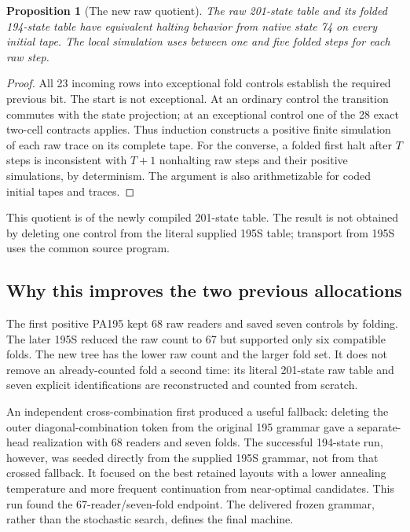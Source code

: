 \documentclass[11pt,letterpaper]{article}
\newtheorem{proposition}[theorem]{Proposition}
\begin{document}
\begin{proposition}[The new raw quotient]
The raw 201-state table and its folded 194-state table have equivalent
halting behavior from native state 74 on every initial tape. The local
simulation uses between one and five folded steps for each raw step.
\end{proposition}
\begin{proof}
All 23 incoming rows into exceptional fold controls establish the required
previous bit. The start is not exceptional. At an ordinary control the
transition commutes with the state projection; at an exceptional control
one of the 28 exact two-cell contracts applies. Thus induction constructs
a positive finite simulation of each raw trace on its complete tape.
For the converse, a folded first halt after $T$ steps is inconsistent with
$T+1$ nonhalting raw steps and their positive simulations, by determinism.
The argument is also arithmetizable for coded initial tapes and traces.
\end{proof}

This quotient is of the newly compiled 201-state table. The result is not
obtained by deleting one control from the literal supplied 195S table;
transport from 195S uses the common source program.



\subsection{Why this improves the two previous allocations}

The first positive PA195 kept 68 raw readers and saved seven controls by
folding. The later 195S reduced the raw count to 67 but supported only six
compatible folds. The new tree has the lower raw count and the larger fold
set. It does not remove an already-counted fold a second time: its literal
201-state raw table and seven explicit identifications are reconstructed
and counted from scratch.

An independent cross-combination first produced a useful fallback: deleting
the outer diagonal-combination token from the original 195 grammar gave
a separate-head realization with 68 readers and seven folds. The successful
194-state run, however, was seeded directly from the supplied 195S grammar,
not from that crossed fallback. It focused on the best retained layouts
with a lower annealing temperature and more frequent continuation from
near-optimal candidates. This run found the 67-reader/seven-fold endpoint.
The delivered frozen grammar, rather than the stochastic search, defines
the final machine.
\end{document}
